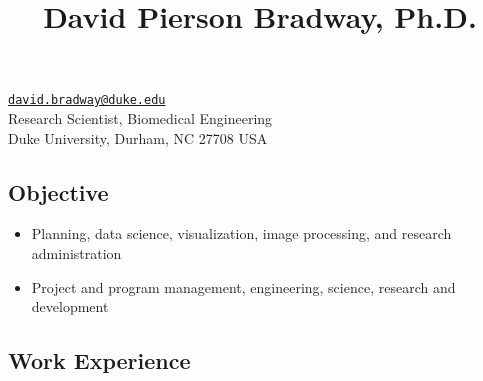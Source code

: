 \documentclass[
]{article}
\title{David Pierson Bradway, Ph.D.}
\author{}
\date{}
\providecommand{\tightlist}{%
  \setlength{\itemsep}{0pt}\setlength{\parskip}{0pt}}
\begin{document}
\maketitle

\href{mailto:david.bradway@duke.edu}{\nolinkurl{david.bradway@duke.edu}}\\
Research Scientist, Biomedical Engineering\\
Duke University, Durham, NC 27708 USA

\hypertarget{objective}{%
\subsection{Objective}\label{objective}}

\begin{itemize}
\tightlist
\item
  Planning, data science, visualization, image processing, and research
  administration
\item
  Project and program management, engineering, science, research and
  development
\end{itemize}

\hypertarget{work-experience}{%
\subsection{Work Experience}\label{work-experience}}
\end{document}
